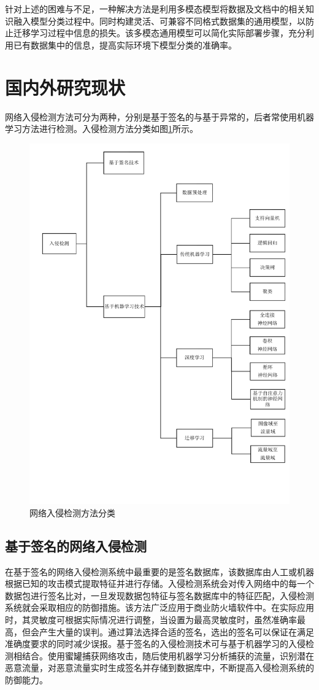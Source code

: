 针对上述的困难与不足，一种解决方法是利用多模态模型将数据及文档中的相关知识融入模型分类过程中。同时构建灵活、可兼容不同格式数据集的通用模型，以防止迁移学习过程中信息的损失。该多模态通用模型可以简化实际部署步骤，充分利用已有数据集中的信息，提高实际环境下模型分类的准确率。
\section{国内外研究现状}
\label{sec: Current research state}

网络入侵检测方法可分为两种，分别是基于签名的与基于异常的，后者常使用机器学习方法进行检测。入侵检测方法分类如图\ref{fig:research_review}所示。

\begin{figure}[htb]
\centering %
\includegraphics[width=.8\linewidth]{img/review.pdf} %
\caption{网络入侵检测方法分类}
\label{fig:research_review} %
\end{figure}%


\subsection{基于签名的网络入侵检测}
在基于签名的网络入侵检测系统中最重要的是签名数据库，该数据库由人工或机器根据已知的攻击模式提取特征并进行存储。入侵检测系统会对传入网络中的每一个数据包进行签名比对，一旦发现数据包特征与签名数据库中的特征匹配，入侵检测系统就会采取相应的防御措施。该方法广泛应用于商业防火墙软件中。在实际应用时，其灵敏度可根据实际情况进行调整，当设置为最高灵敏度时，虽然准确率最高，但会产生大量的误判。通过算法选择合适的签名，选出的签名可以保证在满足准确度要求的同时减少误报\cite{10.3390/app12020852}。基于签名的入侵检测技术可与基于机器学习的入侵检测相结合。使用蜜罐捕获网络攻击，随后使用机器学习分析捕获的流量，识别潜在恶意流量，对恶意流量实时生成签名并存储到数据库中，不断提高入侵检测系统的防御能力\cite{10.1007/s00521-019-04187-9}。

